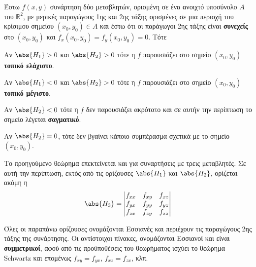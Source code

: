 \documentclass[a4paper,table]{report}
\begin{document}
\begin{mybox2}
\begin{thm}
  \label{thm:2var}
\item {}
  Έστω $ f(x,y) $ συνάρτηση δύο μεταβλητών, ορισμένη σε ένα ανοιχτό 
  υποσύνολο $A$ του $ \mathbb{R}^{2} $, με μερικές παραγώγους 1ης και 2ης τάξης 
  ορισμένες σε μια περιοχή του κρίσιμου σημείου $ (x_{0}, y_{0}) \in A $ και 
  έστω ότι οι παράγωγοι 2ης τάξης είναι \textbf{συνεχείς} στο $ (x_{0}, y_{0}) $ και 
  $ f_{x}(x_{0}, y_{0}) = f_{y}(x_{0}, y_{0}) = 0 $. Τότε
\end{thm}

\begin{myitemize}
  \item Αν $ \abs{H_{1}} > 0 $ και $ \abs{H_{2}} > 0 $ τότε η $f$ παρουσιάζει στο 
    σημείο $ (x_{0}, y_{0}) $ \textbf{τοπικό ελάχιστο}.
  \item Αν $ \abs{H_{1}} < 0 $ και $ \abs{H_{2}} > 0 $ τότε η $f$ παρουσιάζει στο 
    σημείο $ (x_{0}, y_{0}) $ \textbf{τοπικό μέγιστο}.
  \item Αν $ \abs{H_{2}} < 0 $ τότε η $f$ δεν παρουσιάζει ακρότατο και σε αυτήν 
    την περίπτωση το σημείο λέγεται \textbf{σαγματικό}.
  \item Αν $ \abs{H_{2}} = 0 $, τότε δεν βγαίνει κάποιο συμπέρασμα σχετικά με το 
    σημείο $ (x_{0}, y_{0}) $.
\end{myitemize}
\end{mybox2}


Το προηγούμενο θεώρημα επεκτείνεται και για συναρτήσεις με τρεις μεταβλητές. Σε αυτή 
την περίπτωση, εκτός από τις ορίζουσες $ \abs{H_{1}} $ και $ \abs{H_{2}} $, ορίζεται 
ακόμη η
\[
  \abs{H_{3}} = 
  \begin{vmatrix}
    f_{xx} & f_{xy} & f_{xz} \\
    f_{yx} & f_{yy} & f_{yz} \\
    f_{zx} & f_{zy} & f_{zz}
  \end{vmatrix} 
  \hfill 
\] 

\begin{rem}
  Όλες οι παραπάνω ορίζουσες ονομάζονται \textcolor{Col1}{Εσσιανές} και περιέχουν τις 
  παραγώγους 2ης τάξης της συνάρτησης. Οι αντίστοιχοι πίνακες, ονομάζονται 
  \textcolor{Col1}{Εσσιανοί} 
  και είναι \textbf{συμμετρικοί}, αφού από τις προϋποθέσεις του θεωρήματος ισχύει το 
  θεώρημα Schwartz και επομένως $ f_{xy} = f_{yx} $, $ f_{xz} = f_{zx} $, κλπ.
\end{rem}
\end{document}
